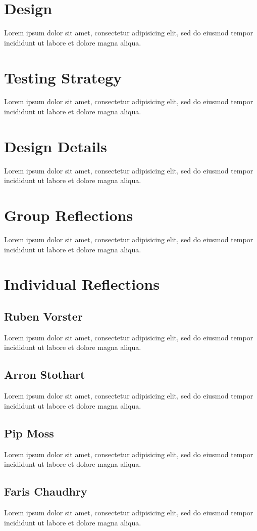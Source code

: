 \documentclass[11pt]{article}
\begin{document}
\section{Design}
Lorem ipsum dolor sit amet, consectetur adipisicing elit, sed do eiusmod tempor
incididunt ut labore et dolore magna aliqua.

\section{Testing Strategy}
Lorem ipsum dolor sit amet, consectetur adipisicing elit, sed do eiusmod tempor
incididunt ut labore et dolore magna aliqua. 

\section{Design Details}
Lorem ipsum dolor sit amet, consectetur adipisicing elit, sed do eiusmod tempor
incididunt ut labore et dolore magna aliqua. 

\section{Group Reflections}
Lorem ipsum dolor sit amet, consectetur adipisicing elit, sed do eiusmod tempor
incididunt ut labore et dolore magna aliqua. 

\section{Individual Reflections}
\subsection{Ruben Vorster}
Lorem ipsum dolor sit amet, consectetur adipisicing elit, sed do eiusmod tempor
incididunt ut labore et dolore magna aliqua.
\subsection{Arron Stothart}
Lorem ipsum dolor sit amet, consectetur adipisicing elit, sed do eiusmod tempor
incididunt ut labore et dolore magna aliqua.
\subsection{Pip Moss}
Lorem ipsum dolor sit amet, consectetur adipisicing elit, sed do eiusmod tempor
incididunt ut labore et dolore magna aliqua.
\subsection{Faris Chaudhry}
Lorem ipsum dolor sit amet, consectetur adipisicing elit, sed do eiusmod tempor
incididunt ut labore et dolore magna aliqua.
\end{document}
